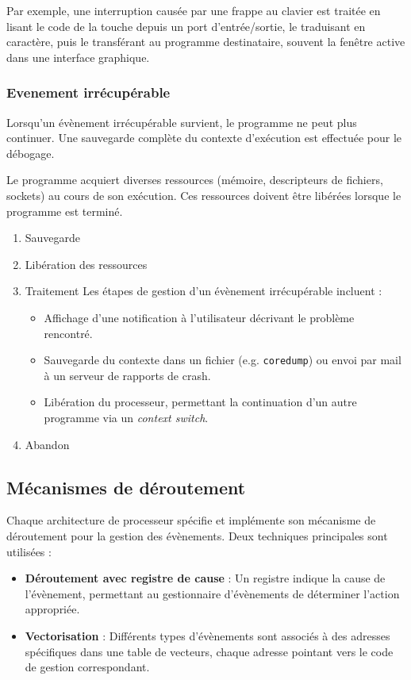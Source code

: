 Par exemple, une interruption causée par une frappe au clavier est traitée en lisant le code de la touche depuis un port d'entrée/sortie, le traduisant en caractère, puis le transférant au programme destinataire, souvent la fenêtre active dans une interface graphique.

\subsubsection{Evenement irrécupérable}

Lorsqu'un évènement irrécupérable survient, le programme ne peut plus continuer.
Une sauvegarde complète du contexte d'exécution est effectuée pour le débogage.

Le programme acquiert diverses ressources (mémoire, descripteurs de fichiers, sockets) au cours de son exécution. 
Ces ressources doivent être libérées lorsque le programme est terminé.

\begin{enumerate}
    \item Sauvegarde
    \item Libération des ressources
    \item Traitement
    Les étapes de gestion d'un évènement irrécupérable incluent :
    \begin{itemize}
        \item Affichage d'une notification à l'utilisateur décrivant le problème rencontré.
        \item Sauvegarde du contexte dans un fichier (e.g. \texttt{coredump}) ou envoi par mail à un serveur de rapports de crash.
        \item Libération du processeur, permettant la continuation d'un autre programme via un \textit{context switch}.
    \end{itemize}
    \item Abandon 
\end{enumerate}

\subsection{Mécanismes de déroutement}

Chaque architecture de processeur spécifie et implémente son mécanisme de déroutement pour la gestion des évènements. 
Deux techniques principales sont utilisées :

\begin{itemize}
    \item \textbf{Déroutement avec registre de cause} : Un registre indique la cause de l'évènement, permettant au gestionnaire d'évènements de déterminer l'action appropriée.
    \item \textbf{Vectorisation} : Différents types d'évènements sont associés à des adresses spécifiques dans une table de vecteurs, chaque adresse pointant vers le code de gestion correspondant.
\end{itemize}

